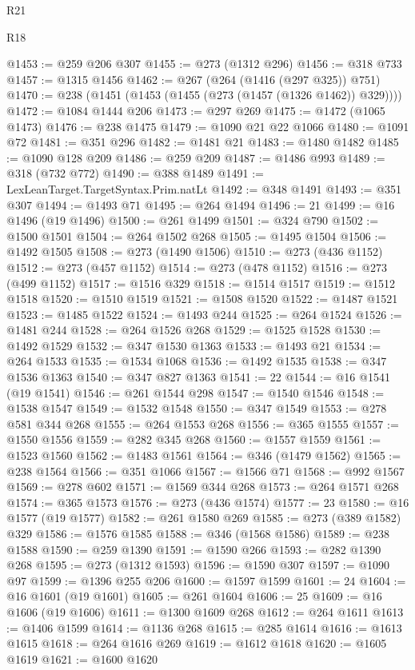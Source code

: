 \begin{lexlean}{R21}
\begin{lexlean}{R18}
\begin{coremodule}
{{{{{{{{{{{{{{{{{{{{{{{{{{{{{{{{{{{{{{{{{{{{{{{{{{{{{{{{{{{{{{{{{{{{{{{{{{{{{{{{{{{{{{{{{{{{{{{{{{{{{{{{{{{{{{{{{{{{{{{{{{{{{{{{{{{{{{{{{{{{{{{@1453 := @259 @206 @307
@1455 := @273 (@1312 @296)
@1456 := @318 @733
@1457 := @1315 @1456
@1462 := @267 (@264 (@1416 (@297 @325)) @751)
@1470 := @238 (@1451 (@1453 (@1455 (@273 (@1457 (@1326 @1462)) @329))))
@1472 := @1084 @1444 @206
@1473 := @297 @269
@1475 := @1472 (@1065 @1473)
@1476 := @238 @1475
@1479 := @1090 @21 @22 @1066
@1480 := @1091 @72
@1481 := @351 @296
@1482 := @1481 @21
@1483 := @1480 @1482
@1485 := @1090 @128 @209
@1486 := @259 @209
@1487 := @1486 @993
@1489 := @318 (@732 @772)
@1490 := @388 @1489
@1491 := LexLeanTarget.TargetSyntax.Prim.natLt
@1492 := @348 @1491
@1493 := @351 @307
@1494 := @1493 @71
@1495 := @264 @1494
@1496 := 21
@1499 := @16 @1496 (@19 @1496)
@1500 := @261 @1499
@1501 := @324 @790
@1502 := @1500 @1501
@1504 := @264 @1502 @268
@1505 := @1495 @1504
@1506 := @1492 @1505
@1508 := @273 (@1490 @1506)
@1510 := @273 (@436 @1152)
@1512 := @273 (@457 @1152)
@1514 := @273 (@478 @1152)
@1516 := @273 (@499 @1152)
@1517 := @1516 @329
@1518 := @1514 @1517
@1519 := @1512 @1518
@1520 := @1510 @1519
@1521 := @1508 @1520
@1522 := @1487 @1521
@1523 := @1485 @1522
@1524 := @1493 @244
@1525 := @264 @1524
@1526 := @1481 @244
@1528 := @264 @1526 @268
@1529 := @1525 @1528
@1530 := @1492 @1529
@1532 := @347 @1530 @1363
@1533 := @1493 @21
@1534 := @264 @1533
@1535 := @1534 @1068
@1536 := @1492 @1535
@1538 := @347 @1536 @1363
@1540 := @347 @827 @1363
@1541 := 22
@1544 := @16 @1541 (@19 @1541)
@1546 := @261 @1544 @298
@1547 := @1540 @1546
@1548 := @1538 @1547
@1549 := @1532 @1548
@1550 := @347 @1549
@1553 := @278 @581 @344 @268
@1555 := @264 @1553 @268
@1556 := @365 @1555
@1557 := @1550 @1556
@1559 := @282 @345 @268
@1560 := @1557 @1559
@1561 := @1523 @1560
@1562 := @1483 @1561
@1564 := @346 (@1479 @1562)
@1565 := @238 @1564
@1566 := @351 @1066
@1567 := @1566 @71
@1568 := @992 @1567
@1569 := @278 @602
@1571 := @1569 @344 @268
@1573 := @264 @1571 @268
@1574 := @365 @1573
@1576 := @273 (@436 @1574)
@1577 := 23
@1580 := @16 @1577 (@19 @1577)
@1582 := @261 @1580 @269
@1585 := @273 (@389 @1582) @329
@1586 := @1576 @1585
@1588 := @346 (@1568 @1586)
@1589 := @238 @1588
@1590 := @259 @1390
@1591 := @1590 @266
@1593 := @282 @1390 @268
@1595 := @273 (@1312 @1593)
@1596 := @1590 @307
@1597 := @1090 @97
@1599 := @1396 @255 @206
@1600 := @1597 @1599
@1601 := 24
@1604 := @16 @1601 (@19 @1601)
@1605 := @261 @1604
@1606 := 25
@1609 := @16 @1606 (@19 @1606)
@1611 := @1300 @1609 @268
@1612 := @264 @1611
@1613 := @1406 @1599
@1614 := @1136 @268
@1615 := @285 @1614
@1616 := @1613 @1615
@1618 := @264 @1616 @269
@1619 := @1612 @1618
@1620 := @1605 @1619
@1621 := @1600 @1620
}}}}}}}}}}}}}}}}}}}}}}}}}}}}}}}}}}}}}}}}}}}}}}}}}}}}}}}}}}}}}}}}}}}}}}}}}}}}}}}}}}}}}}}}}}}}}}}}}}}}}}}}}}}}}}}}}}}}}}}}}}}}}}}}}}}}}}}}}}}}}}}
\end{coremodule}
\end{lexlean}
\end{lexlean}
